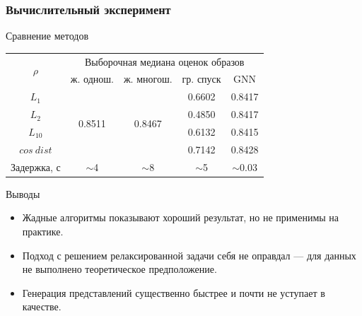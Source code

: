 \documentclass[10pt]{beamer}
\begin{document}
\begin{frame}
	\frametitle{Вычислительный эксперимент}
	\begin{block}{Сравнение методов}
		\begin{center}
			\begin{tabular}{|c|cccc|}
				\hline
				\multirow{2}{*}{$\rho$} & \multicolumn{4}{c|}{Выборочная медиана оценок образов}                                                                       \\ \cline{2-5} 
				& \multicolumn{1}{c|}{ж. однош.}            & \multicolumn{1}{c|}{ж. многош.}           & \multicolumn{1}{c|}{гр. спуск} & GNN \\ \hline
				$L_1$                   & \multicolumn{1}{c|}{\multirow{4}{*}{0.8511}} & \multicolumn{1}{c|}{\multirow{4}{*}{0.8467}} & \multicolumn{1}{c|}{0.6602}         & 0.8417    \\ \cline{1-1} \cline{4-5} 
				$L_2$                   & \multicolumn{1}{c|}{}                     & \multicolumn{1}{c|}{}                     & \multicolumn{1}{c|}{0.4850}         & 0.8417  \\ \cline{1-1} \cline{4-5} 
				$L_{10}$                & \multicolumn{1}{c|}{}                     & \multicolumn{1}{c|}{}                     & \multicolumn{1}{c|}{0.6132}         &  0.8415  \\ \cline{1-1} \cline{4-5} 
				$cos~dist$              & \multicolumn{1}{c|}{}                     & \multicolumn{1}{c|}{}                     & \multicolumn{1}{c|}{0.7142}         &  0.8428  \\ \hline
				Задержка, с             & \multicolumn{1}{c|}{$\sim$4}                     & \multicolumn{1}{c|}{$\sim$8}                     & \multicolumn{1}{c|}{$\sim$5}          &   $\sim$0.03  \\ \hline
			\end{tabular}
		\end{center}
	
	\end{block}
	\begin{block}{Выводы}
		\begin{itemize}
		\item Жадные алгоритмы показывают хороший результат, но не применимы на практике. 
		\item Подход с решением релаксированной задачи себя не оправдал --- для данных не выполнено теоретическое предположение.\\
		\item Генерация представлений существенно быстрее и почти не уступает в качестве.
		\end{itemize}
	\end{block}
\end{frame}
\end{document}
